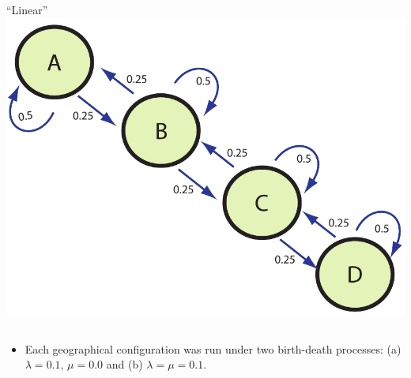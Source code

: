 \documentclass[11pt,t]{beamer}
\begin{document}
\begin{frame}
\begin{columns}
			\begin{column}[c]{0.4 \textwidth}
				\begin{center}
				``Linear''			\\
				\includegraphics[scale=0.25]{linear-model.pdf}
				\end{center}				
			\end{column}							
		\end{columns}
	\begin{itemize}
	\item Each geographical configuration was run under two birth-death processes: (a) $\lambda=0.1$, $\mu=0.0$ and (b) $\lambda = \mu = 0.1$.
	\end{itemize}
\end{frame}
\end{document}
